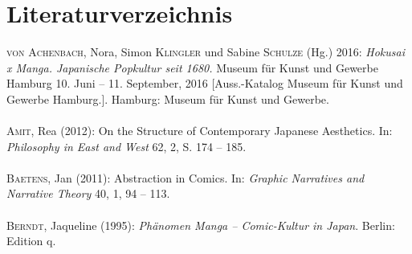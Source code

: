 \newpage

\section{Literaturverzeichnis}

\noindent\textsc{von Achenbach}, Nora, Simon \textsc{Klingler} und Sabine \textsc{Schulze} (Hg.) 2016: \textsl{Hokusai x Manga. Japanische Popkultur seit 1680.} Museum für Kunst und Gewerbe Hamburg 10. Juni -- 11. September, 2016 [Auss.-Katalog Museum für Kunst und Gewerbe Hamburg.]. Hamburg: Museum für Kunst und Gewerbe.\\ 
\\
\textsc{Amit}, Rea (2012): On the Structure of Contemporary Japanese Aesthetics. In: \textsl{Philosophy in East and West} 62, 2, S. 174 -- 185.\\
\\
\textsc{Baetens}, Jan (2011): Abstraction in Comics. In: \textsl{Graphic Narratives and Narrative Theory} 40, 1, 94 -- 113.\\
\\
\textsc{Berndt}, Jaqueline (1995): \textsl{Phänomen Manga -- Comic-Kultur in Japan}. Berlin: Edition q.\\
\\
